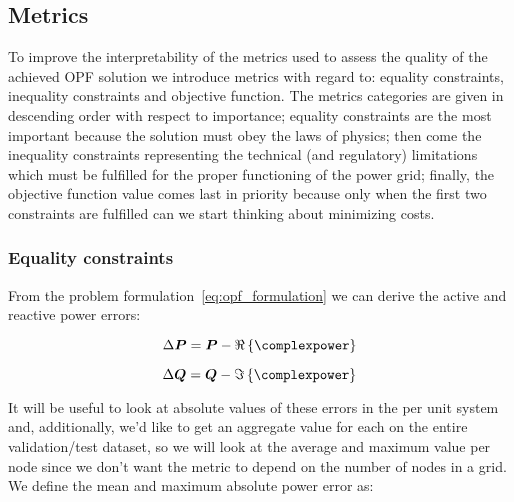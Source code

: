 \subsection*{Metrics}
To improve the interpretability of the metrics used to assess the quality of the achieved OPF solution
we introduce metrics with regard to: equality constraints, inequality constraints and objective function.
The metrics categories are given in descending order with respect to importance; equality constraints are
the most important because the solution must obey the laws of physics; then come the inequality constraints
representing the technical (and regulatory) limitations which must be fulfilled for the proper functioning
of the power grid; finally, the objective function value comes last in priority because only when the
first two constraints are fulfilled can we start thinking about minimizing costs.

\subsubsection*{Equality constraints}
From the problem formulation~\ref{eq:opf_formulation} we can derive the active and reactive power errors:

\begin{equation}
    \label{eq:active_power_error}
    \Delta \boldsymbol{P} = \boldsymbol{P} - \Re\left\{ \complexpower \right\}
\end{equation}

\begin{equation}
    \label{eq:reactive_power_error}
    \Delta \boldsymbol{Q} = \boldsymbol{Q} - \Im\left\{ \complexpower \right\}
\end{equation}

\noindent It will be useful to look at absolute values of these errors in the per unit system and, additionally, we'd like to get an aggregate value
for each on the entire validation/test dataset, so we will look at the average and maximum value
per node since we don't want the metric to depend on the number of nodes in a grid.
We define the mean and maximum absolute power error as:

\newcommand{\abs}[1]{\left| #1 \right|}

\newcommand{\expectedvalue}[1]{\mathbb{E} \left\{#1\right\}}

\newcommand{\expectedabsvalue}[1]{\expectedvalue{\abs{#1}}}

\newcommand{\expectedrelativeabsvalue}[1]{\expectedabsvalue{\frac{\Delta #1}{#1}}}


